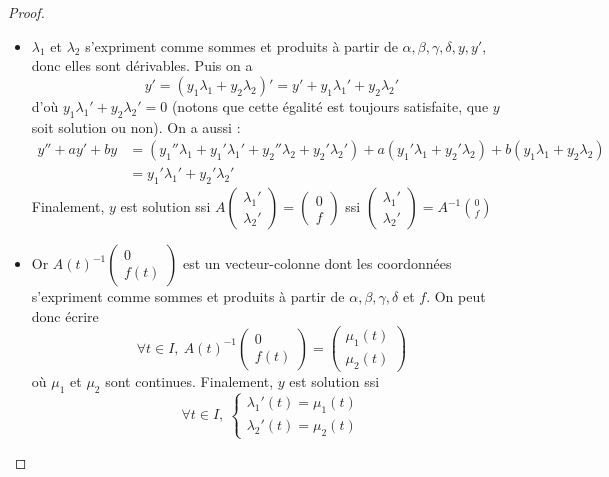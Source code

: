 \documentclass[french]{book}
\theoremstyle{plain}
\theoremstyle{definition}
\theoremstyle{remark}
\begin{document}
\begin{proof}
\begin{itemize}
	Si on note $\alpha(t), \beta(t), \gamma(t), \delta(t)$ les coefficients de $A(t)^{-1},$ on voit que $\alpha, \beta, \gamma, \delta$ sont des
	fonctions dérivables (comme quotients dont le dénominateur $W(t)$ ne s'annule pas). On
	peut alors poser, pour toute fonction $y$ deux fois dérivable,
	$$\begin{pmatrix} \lambda_1 \\ \lambda_2 \end{pmatrix} = A^{-1} \begin{pmatrix} y \\ y' \end{pmatrix}$$
	\item 
	$\lambda_1$ et $\lambda_2$ s'expriment comme sommes et produits à partir de $\alpha, \beta, \gamma, \delta, y, y'$, donc elles sont dérivables. Puis on a $$y' = (y_1 \lambda_1 + y_2 \lambda_2)' = y' + y_1 \lambda_1' + y_2 \lambda_2'$$ d'où $y_1 \lambda_1' + y_2 \lambda_2' = 0$ (notons que cette égalité est toujours satisfaite, que $y$ soit solution ou non). On a aussi :
	\begin{align*}
		y'' + ay' + by &= (y_1'' \lambda_1 + y_1' \lambda_1' + y_2'' \lambda_2 + y_2' \lambda_2') + a(y_1' \lambda_1 + y_2' \lambda_2) + b(y_1 \lambda_1 + y_2 \lambda_2)\\
		&= y_1' \lambda_1' + y_2' \lambda_2'
	\end{align*}
	Finalement, $y$ est solution ssi $\displaystyle A \begin{pmatrix} \lambda_1' \\ \lambda_2' \end{pmatrix} = \begin{pmatrix} 0 \\ f \end{pmatrix}$ ssi $\displaystyle\begin{pmatrix} \lambda_1' \\ \lambda_2' \end{pmatrix} = A^{-1} \binom{0}{f}$
	\item Or $\displaystyle A(t)^{-1} \begin{pmatrix} 0 \\ f(t) \end{pmatrix}$ est un vecteur-colonne dont les coordonnées s'expriment comme sommes et produits à partir de $\alpha, \beta, \gamma, \delta$ et $f$. On peut donc écrire $$\forall t\in I,\ A(t)^{-1} \begin{pmatrix} 0 \\ f(t) \end{pmatrix} = \begin{pmatrix} \mu_1(t) \\ \mu_2(t) \end{pmatrix}$$ où $\mu_1$ et $\mu_2$ sont continues. Finalement, $y$ est solution ssi $$\forall t \in I,\ \begin{cases} \lambda_1'(t) = \mu_1(t) \\ \lambda_2'(t) = \mu_2(t) \end{cases}$$

\end{itemize}
\end{proof}
\end{document}
